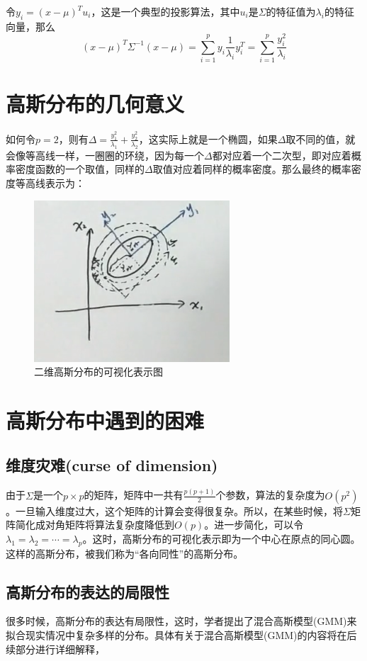 \documentclass[a4paper]{article}
\begin{document}
令$y_i=(x-\mu)^Tu_i$，这是一个典型的投影算法，其中$u_i$是$\Sigma$的特征值为$\lambda_i$的特征向量，那么
\begin{equation}
    (x-\mu)^T\Sigma^{-1}(x-\mu) = \sum_{i=1}^{p} y_i\frac{1}{\lambda_i} y_i^T=\sum_{i=1}^p\frac{y_i^2}{\lambda_i}
\end{equation}

\section{高斯分布的几何意义}
如何令$p=2$，则有$\Delta = \frac{y_1^2}{\lambda_1} + \frac{y_2^2}{\lambda_2} $，这实际上就是一个椭圆，如果$\Delta$取不同的值，就会像等高线一样，一圈圈的环绕，因为每一个$\Delta$都对应着一个二次型，即对应着概率密度函数的一个取值，同样的$\Delta$取值对应着同样的概率密度。那么最终的概率密度等高线表示为：
\begin{figure}[H]
    \centering
    \includegraphics[width=.5\textwidth]{20191019203302.png}
    \caption{二维高斯分布的可视化表示图}
    \label{fig:my_label_1}
\end{figure}


\section{高斯分布中遇到的困难}
\subsection{维度灾难(curse of dimension)}
由于$\Sigma$是一个$p\times p$的矩阵，矩阵中一共有$\frac{p(p+1)}{2}$个参数，算法的复杂度为$O(p^2)$。一旦输入维度过大，这个矩阵的计算会变得很复杂。所以，在某些时候，将$\Sigma$矩阵简化成对角矩阵将算法复杂度降低到$O(p)$。进一步简化，可以令$\lambda_1=\lambda_2=\cdots=\lambda_p$。这时，高斯分布的可视化表示即为一个中心在原点的同心圆。这样的高斯分布，被我们称为“各向同性”的高斯分布。

\subsection{高斯分布的表达的局限性}
很多时候，高斯分布的表达有局限性，这时，学者提出了混合高斯模型(GMM)来拟合现实情况中复杂多样的分布。具体有关于混合高斯模型(GMM)的内容将在后续部分进行详细解释，
\end{document}
